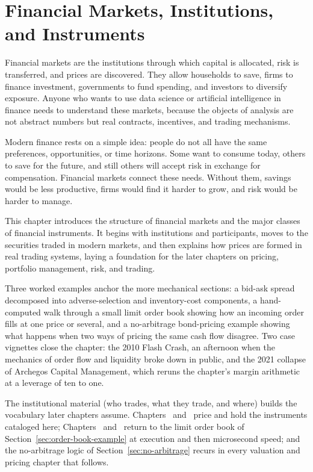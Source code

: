 \documentclass[../ai_in_finance]{subfiles}
\begin{document}
\chapter{Financial Markets, Institutions, and Instruments}

Financial markets are the institutions through which capital is allocated, risk is transferred, and prices are discovered. They allow households to save, firms to finance investment, governments to fund spending, and investors to diversify exposure. Anyone who wants to use data science or artificial intelligence in finance needs to understand these markets, because the objects of analysis are not abstract numbers but real contracts, incentives, and trading mechanisms.

Modern finance rests on a simple idea: people do not all have the same preferences, opportunities, or time horizons. Some want to consume today, others to save for the future, and still others will accept risk in exchange for compensation. Financial markets connect these needs. Without them, savings would be less productive, firms would find it harder to grow, and risk would be harder to manage.

This chapter introduces the structure of financial markets and the major classes of financial instruments. It begins with institutions and participants, moves to the securities traded in modern markets, and then explains how prices are formed in real trading systems, laying a foundation for the later chapters on pricing, portfolio management, risk, and trading.

Three worked examples anchor the more mechanical sections: a bid-ask spread decomposed into adverse-selection and inventory-cost components, a hand-computed walk through a small limit order book showing how an incoming order fills at one price or several, and a no-arbitrage bond-pricing example showing what happens when two ways of pricing the same cash flow disagree. Two case vignettes close the chapter: the 2010 Flash Crash, an afternoon when the mechanics of order flow and liquidity broke down in public, and the 2021 collapse of Archegos Capital Management, which reruns the chapter's margin arithmetic at a leverage of ten to one.

The institutional material (who trades, what they trade, and where) builds the vocabulary later chapters assume. Chapters~ and~ price and hold the instruments cataloged here; Chapters~ and~ return to the limit order book of Section~\ref{sec:order-book-example} at execution and then microsecond speed; and the no-arbitrage logic of Section~\ref{sec:no-arbitrage} recurs in every valuation and pricing chapter that follows.
\end{document}
